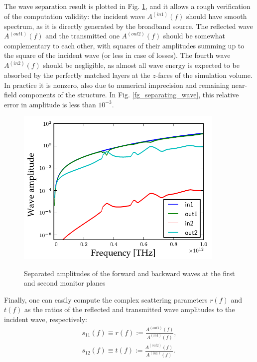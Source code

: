 The wave separation result is plotted in Fig. \ref{fg_ampli}, and it allows a rough verification of the computation validity: the incident wave $A^{(in 1)}(f)$ should have smooth spectrum, as it is directly generated by the broadband source. The reflected wave $A^{(out 1)}(f)$ and the transmitted one $A^{(out 2)}(f)$ should be somewhat complementary to each other, with squares of their amplitudes summing up to the square of the incident wave (or less in case of losses). The fourth wave $A^{(in 2)}(f)$ should be negligible, as almost all wave energy is expected to be absorbed by the perfectly matched layers at the $z$-faces of the simulation volume. In practice it is nonzero, also due to numerical imprecision and remaining near-field components of the structure. In Fig. \ref{fg_separating_wave}, this relative error in amplitude is less than $10^{-3}$.
\begin{figure}[ht] \caption{Separated amplitudes of the forward and backward waves at the first and second monitor planes}  \centering \includegraphics[width=10cm]{img/sim_ampli_debug_band.pdf}\label{fg_ampli} \end{figure} 

Finally, one can easily compute the complex scattering parameters $r(f)$ and $t(f)$ as the ratios of the reflected and transmitted wave amplitudes to the incident wave, respectively:
\begin{equation} 
	\begin{split}
		s_{11}(f) \equiv r(f) := \frac{A^{(out 1)}(f)}{A^{(in 1)}(f)},\\
		s_{12}(f) \equiv t(f) := \frac{A^{(out 2)}(f)}{A^{(in 1)}(f)}.
	\end{split}
\label{eq_sparam}\end{equation}
